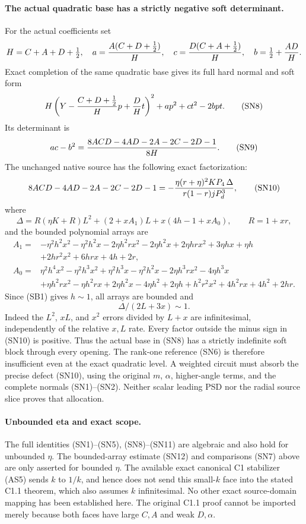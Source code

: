 \paragraph{The actual quadratic base has a strictly negative soft determinant.}
For the actual coefficients set
\[
 H=C+A+D+\tfrac12,\quad
 a={A(C+D+\tfrac12)\over H},\quad
 c={D(C+A+\tfrac12)\over H},\quad
 b=\tfrac12+{AD\over H}.
\]
Exact completion of the same quadratic base gives its full hard
normal and soft form
\[
 H\left(Y-{C+D+\tfrac12\over H}p+{D\over H}t\right)^2
                        +ap^2+ct^2-2bpt.               \tag{SN8}
\]
Its determinant is
\[
 ac-b^2={8ACD-4AD-2A-2C-2D-1\over8H}.                  \tag{SN9}
\]
The unchanged native source has the following exact factorization:
\[
 8ACD-4AD-2A-2C-2D-1
 =-{\eta(r+\eta)^2KP_4\,\Delta
          \over r(1-r)jP_d^3},                         \tag{SN10}
\]
where
\[
 \Delta=R(\eta K+R)L^2+(2+xA_1)L+x(4h-1+xA_0),
 \qquad R=1+xr,                                        \tag{SN11}
\]
and the bounded polynomial arrays are
\[
\begin{split}
 A_1={}&-\eta^2h^2x^2-\eta^2h^2x
 -2\eta h^2rx^2-2\eta h^2x+2\eta hrx^2
 +3\eta hx+\eta h\\
 &+2hr^2x^2+6hrx+4h+2r,\\
 A_0={}&\eta^2h^4x^2-\eta^2h^3x^2+\eta^2h^3x-\eta^2h^2x
 -2\eta h^3rx^2-4\eta h^3x\\
 &+\eta h^2rx^2-\eta h^2rx+2\eta h^2x-4\eta h^2+2\eta h
 +h^2r^2x^2+4h^2rx+4h^2+2hr.
\end{split}
\]
Since (SB1) gives $h\sim1$, all arrays are bounded and
\[
                  \Delta/(2L+3x)\sim1.                 \tag{SN12}
\]
Indeed the $L^2$, $xL$, and $x^2$ errors divided by $L+x$
are infinitesimal, independently of the relative $x,L$ rate.
Every factor outside the minus sign in (SN10) is positive.
Thus the actual base in (SN8) has a strictly indefinite soft block
through every opening. The rank-one reference (SN6) is therefore
insufficient even at the exact quadratic level. A weighted circuit
must absorb the precise defect (SN10), using the original $m$,
$\alpha$, higher-angle terms, and the complete normals (SN1)--(SN2).
Neither scalar leading PSD nor the radial source slice proves that
allocation.

\paragraph{Unbounded eta and exact scope.}
The full identities (SN1)--(SN5), (SN8)--(SN11) are algebraic and
also hold for unbounded $\eta$. The bounded-array estimate (SN12)
and comparisons (SN7) above are only asserted for bounded $\eta$.
The available exact canonical C1 stabilizer (AS5) sends $k$ to
$1/k$, and hence does not send this small-$k$ face into the stated
C1.1 theorem, which also assumes $k$ infinitesimal. No other exact
source-domain mapping has been established here. The original
C1.1 proof cannot be imported merely because both faces have large
$C,A$ and weak $D,\alpha$.

